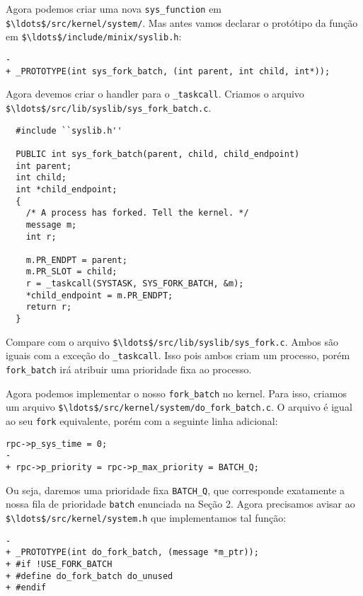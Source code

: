 \documentclass{amsart}
\theoremstyle{plain}
\newcommand{\code}[1]{\lstinline[mathescape=true]{#1}}
\newcommand{\mcode}[1]{\lstinline[mathescape]!#1!}
\begin{document}
Agora podemos criar uma nova \code{sys_function} em \mcode{$\ldots$/src/kernel/system/}. Mas antes
vamos declarar o protótipo da função em \mcode{$\ldots$/include/minix/syslib.h}:

\begin{lstlisting}[frame=leftline,mathescape=true,style=nonumbers]
-
+ _PROTOTYPE(int sys_fork_batch, (int parent, int child, int*));
\end{lstlisting}

Agora devemos criar o handler para o \code{_taskcall}. Criamos o arquivo
\mcode{$\ldots$/src/lib/syslib/sys_fork_batch.c}.

\begin{verbatim}
  #include ``syslib.h''

  PUBLIC int sys_fork_batch(parent, child, child_endpoint)
  int parent;
  int child;
  int *child_endpoint;
  {
    /* A process has forked. Tell the kernel. */
    message m;
    int r;

    m.PR_ENDPT = parent;
    m.PR_SLOT = child;
    r = _taskcall(SYSTASK, SYS_FORK_BATCH, &m);
    *child_endpoint = m.PR_ENDPT;
    return r;
  }
\end{verbatim}

Compare com o arquivo \mcode{$\ldots$/src/lib/syslib/sys_fork.c}. Ambos são iguais com a exceção
do \code{_taskcall}. Isso pois ambos criam um processo, porém \code{fork_batch} irá atribuir uma
prioridade fixa ao processo.

Agora podemos implementar o nosso \code{fork_batch} no kernel. Para isso, criamos um arquivo
\mcode{$\ldots$/src/kernel/system/do_fork_batch.c}. O arquivo é igual ao seu \code{fork}
equivalente, porém com a seguinte linha adicional:

\begin{lstlisting}[frame=leftline,mathescape=true,style=nonumbers]
rpc->p_sys_time = 0;
-
+ rpc->p_priority = rpc->p_max_priority = BATCH_Q;
\end{lstlisting}

Ou seja, daremos uma prioridade fixa \code{BATCH_Q}, que corresponde exatamente a nossa fila de
prioridade \code{batch} enunciada na Seção 2. Agora precisamos avisar ao
\mcode{$\ldots$/src/kernel/system.h} que implementamos tal função:

\begin{lstlisting}[frame=leftline,mathescape=true,style=nonumbers]
-
+ _PROTOTYPE(int do_fork_batch, (message *m_ptr));
+ #if !USE_FORK_BATCH
+ #define do_fork_batch do_unused
+ #endif
\end{lstlisting}
\end{document}
